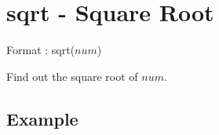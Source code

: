 %

\section{sqrt - Square Root\label{sect:sqrt}}

Format : sqrt($num$)

Find out the square root of $num$.

\subsection*{Example}




%

